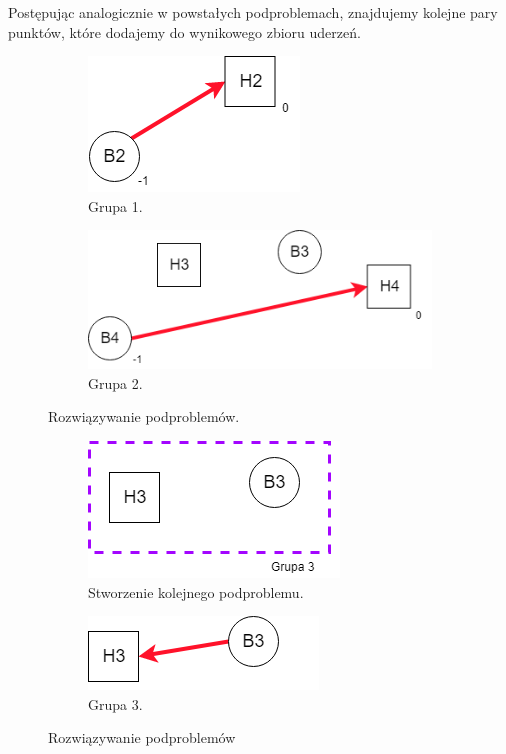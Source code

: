 \documentclass[10pt,a4paper]{article}
\begin{document}
	Postępując analogicznie w powstałych podproblemach, znajdujemy kolejne pary punktów, które dodajemy do wynikowego zbioru uderzeń.

	\begin{figure}[H]
		\centering
		\begin{subfigure}[b]{0.4\linewidth}
			\includegraphics[scale=0.5]{images/step41.png}
			\caption{Grupa 1.}
		\end{subfigure}
		\begin{subfigure}[b]{0.4\linewidth}
			\includegraphics[width=\linewidth]{images/step421.png}
			\caption{Grupa 2.}
		\end{subfigure}
		\caption{Rozwiązywanie podproblemów.}
		\label{fig:coffee}
	\end{figure}

	\begin{figure}[H]
		\centering
		\begin{subfigure}[b]{0.4\linewidth}
			\includegraphics[scale=0.6]{images/step422.png}
			\caption{Stworzenie kolejnego podproblemu.}
		\end{subfigure}
		\begin{subfigure}[b]{0.4\linewidth}
			\includegraphics[scale=0.7]{images/step423.png}
			\caption{Grupa 3.}
		\end{subfigure}
		\caption{Rozwiązywanie podproblemów}
		\label{fig:coffee}
	\end{figure}
	
\end{document}
